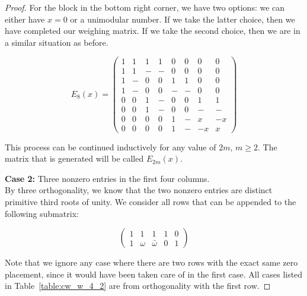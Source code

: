 \begin{lemma}
\begin{proof}
For the block in the bottom right corner, we have two options: we can either have $x = 0$ or a unimodular number. If we take the latter choice, then we have completed our weighing matrix. If we take the second choice, then we are in a similar situation as before.

 $$E_8(x)=\left(\begin{array}{cccccccc}
     1 & 1 & 1 & 1 & 0 & 0 & 0 & 0 \\
     1 & 1 & - & - & 0 & 0 & 0 & 0 \\
     1 & - & 0 & 0 & 1 & 1 & 0 & 0 \\
     1 & - & 0 & 0 & - & - & 0 & 0 \\
     0 & 0 & 1 & - & 0 & 0 & 1 & 1 \\
     0 & 0 & 1 & - & 0 & 0 & - & - \\
     0 & 0 & 0 & 0 & 1 & - & x & -x \\
     0 & 0 & 0 & 0 & 1 & - & -x & x
    \end{array}\right)$$

 This process can be continued inductively for any value of $2m$, $m \geq 2$. The matrix that is generated will be called $E_{2m}(x)$.

\vskip0.2cm
{\bf Case 2:} Three nonzero entries in the first four columns. \\
  By three orthogonality, we know that the two nonzero entries are distinct primitive third roots of unity. We consider all rows that can be appended to the following submatrix:

 $$\left(\begin{array}{ccccc}
     1 & 1 & 1 & 1 & 0\\
     1 & \omega & \bar{\omega} & 0 & 1
    \end{array}\right)$$

 Note that we ignore any case where there are two rows with the exact same zero placement, since it would have been taken care of in the first case. All cases listed in Table~\ref{table:cw_w_4_2} are from orthogonality with the first row.


\end{proof}
\end{lemma}
